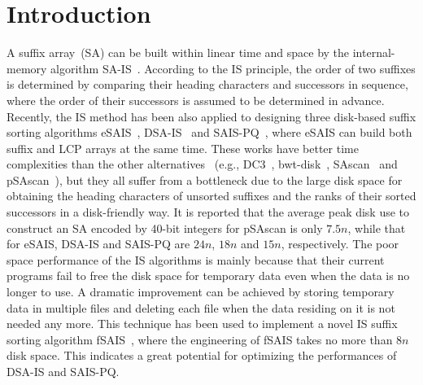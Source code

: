 \documentclass[10pt,journal,compsoc]{IEEEtran}
\begin{document}
\IEEEpeerreviewmaketitle

\section{Introduction}\label{sec:introduction}

A suffix array~(SA) can be built within linear time and space by the internal-memory algorithm SA-IS~\cite{Nong11}. According to the IS principle, the order of two suffixes is determined by comparing their heading characters and successors in sequence, where the order of their successors is assumed to be determined in advance. Recently, the IS method has been also applied to designing three disk-based suffix sorting algorithms eSAIS~\cite{Bingmann12}, DSA-IS~\cite{Nong15} and SAIS-PQ~\cite{Liu15}, where eSAIS can build both suffix and LCP arrays at the same time. These works have better time complexities than the other alternatives ~(e.g., DC3~\cite{Dementiev2008a}, bwt-disk~\cite{Ferragina2012}, SAscan~\cite{Karkkainen2014} and pSAscan~\cite{Karkkainen2015}), but they all suffer from a bottleneck due to the large disk space for obtaining the heading characters of unsorted suffixes and the ranks of their sorted successors in a disk-friendly way. It is reported that the average peak disk use to construct an SA encoded by 40-bit integers for pSAscan is only $7.5n$, while that for eSAIS, DSA-IS and SAIS-PQ are $24n$, $18n$ and $15n$, respectively. The poor space performance of the IS algorithms is mainly because that their current programs fail to free the disk space for temporary data even when the data is no longer to use. A dramatic improvement can be achieved by storing temporary data in multiple files and deleting each file when the data residing on it is not needed any more. This technique has been used to implement a novel IS suffix sorting algorithm fSAIS~\cite{Karkkainen2017}, where the engineering of fSAIS takes no more than $8n$ disk space. This indicates a great potential for optimizing the performances of DSA-IS and SAIS-PQ.
\end{document}
